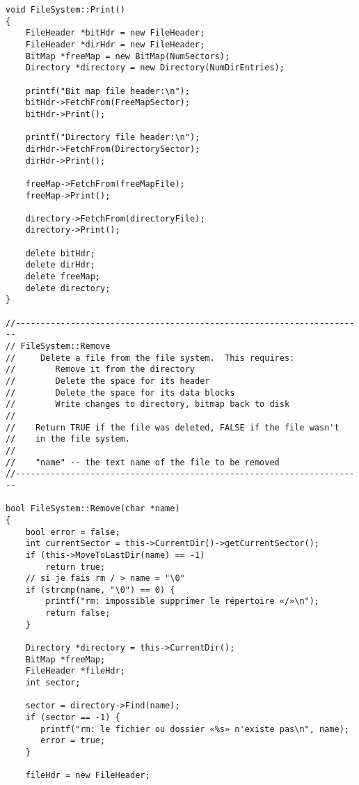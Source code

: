 \documentclass[a4paper,10pt]{article}
\begin{document}
\begin{lstlisting}
void FileSystem::Print()
{
    FileHeader *bitHdr = new FileHeader;
    FileHeader *dirHdr = new FileHeader;
    BitMap *freeMap = new BitMap(NumSectors);
    Directory *directory = new Directory(NumDirEntries);

    printf("Bit map file header:\n");
    bitHdr->FetchFrom(FreeMapSector);
    bitHdr->Print();

    printf("Directory file header:\n");
    dirHdr->FetchFrom(DirectorySector);
    dirHdr->Print();

    freeMap->FetchFrom(freeMapFile);
    freeMap->Print();

    directory->FetchFrom(directoryFile);
    directory->Print();

    delete bitHdr;
    delete dirHdr;
    delete freeMap;
    delete directory;
}

//----------------------------------------------------------------------
// FileSystem::Remove
//     Delete a file from the file system.  This requires:
//        Remove it from the directory
//        Delete the space for its header
//        Delete the space for its data blocks
//        Write changes to directory, bitmap back to disk
//
//    Return TRUE if the file was deleted, FALSE if the file wasn't
//    in the file system.
//
//    "name" -- the text name of the file to be removed
//----------------------------------------------------------------------

bool FileSystem::Remove(char *name)
{
    bool error = false;
    int currentSector = this->CurrentDir()->getCurrentSector();
    if (this->MoveToLastDir(name) == -1)
        return true;
    // si je fais rm / > name = "\0"
    if (strcmp(name, "\0") == 0) {
        printf("rm: impossible supprimer le répertoire «/»\n");
        return false;
    }

    Directory *directory = this->CurrentDir();
    BitMap *freeMap;
    FileHeader *fileHdr;
    int sector;

    sector = directory->Find(name);
    if (sector == -1) {
       printf("rm: le fichier ou dossier «%s» n'existe pas\n", name);
       error = true;
    }

    fileHdr = new FileHeader;


\end{lstlisting}
\end{document}
